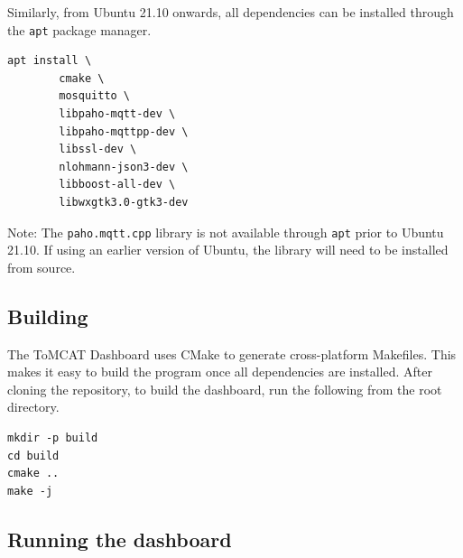 Similarly, from Ubuntu 21.10 onwards, all dependencies can be installed through
the \texttt{apt} package manager.

\begin{verbatim}
apt install \
        cmake \
        mosquitto \
        libpaho-mqtt-dev \
        libpaho-mqttpp-dev \
        libssl-dev \
        nlohmann-json3-dev \
        libboost-all-dev \
        libwxgtk3.0-gtk3-dev
\end{verbatim}

Note: The \texttt{paho.mqtt.cpp} library  is not available through \texttt{apt}
prior to Ubuntu 21.10. If using an earlier version of Ubuntu, the library will
need to be installed from source.

\subsection{Building}

The ToMCAT Dashboard uses CMake to generate cross-platform Makefiles. This
makes it easy to build the program once all dependencies are installed. After
cloning the repository, to build the dashboard, run the following from the root
directory.

\begin{verbatim}
mkdir -p build
cd build
cmake ..
make -j
\end{verbatim}


\subsection{Running the dashboard}

